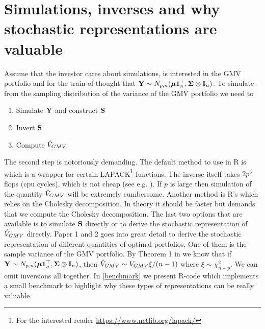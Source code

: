 \documentclass[oneside]{book}\usepackage{knitr}
\begin{document}
\section{Simulations, inverses and why stochastic representations are valuable}
Assume that the investor cares about simulations, is interested in the GMV portfolio and for the train of thought that $\mathbf{Y} \sim N_{p,n}(\mbox{\boldmath$\mu$} \mathbf{1}_n^\top, \mathbf{\Sigma} \otimes \mathbf{I}_n)$. 
To simulate from the sampling distribution of the variance of the GMV portfolio we need to 
\begin{enumerate}
  \item Simulate $\mathbf{Y}$ and construct $\mathbf{S}$
  \item Invert $\mathbf{S}$
  \item Compute $\hat{V}_{GMV}$
\end{enumerate}
The second step is notoriously demanding.
The default method to use in R is  which is a wrapper for certain LAPACK\footnote{For the interested reader \url{https://www.netlib.org/lapack/}} functions.
The inverse itself takes $2p^3$ flops (cpu cycles), which is not cheap (see e.g. \citet[ch 14]{higham2002accuracy}).
If $p$ is large then simulation of the quantity $\hat{V}_{GMV}$ will be extremely cumbersome.
Another method is R's  which relies on the Cholesky decomposition. 
In theory it should be faster but demands that we compute the Cholesky decomposition.
The last two options that are available is to simulate $\mathbf{S}$ directly or to derive the stochastic representation of $\hat{V}_{GMV}$ directly.
Paper 1 and 2 goes into great detail to derive the stochastic representation of different quantities of optimal portfolios. 
One of them is the sample variance of the GMV portfolio.
By Theorem 1 in \citet{bodnar2020sampling} we know that if $\mathbf{Y} \sim N_{p,n}(\mbox{\boldmath$\mu$} \mathbf{1}_n^\top, \mathbf{\Sigma} \otimes \mathbf{I}_n)$, then $\hat{V}_{GMV} \sim V_{GMV}\xi /(n-1)$ where $\xi \sim \chi^2_{n-p}$.
We can omit inversions all together.
In \ref{benchmark} we present R-code which implements a small benchmark to highlight why these types of representations can be really valuable.
\end{document}
